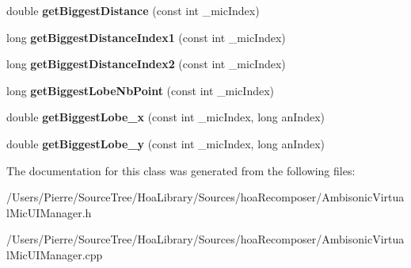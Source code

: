 \begin{DoxyCompactItemize}
\item 
\hypertarget{class_ambisonic_virtual_mic_u_i_manager_a7856cdd940fe530019a74c2dbda2b756}{double {\bfseries get\-Biggest\-Distance} (const int \-\_\-mic\-Index)}\label{class_ambisonic_virtual_mic_u_i_manager_a7856cdd940fe530019a74c2dbda2b756}

\item 
\hypertarget{class_ambisonic_virtual_mic_u_i_manager_a812fb44d360067072455ab8c98ac814c}{long {\bfseries get\-Biggest\-Distance\-Index1} (const int \-\_\-mic\-Index)}\label{class_ambisonic_virtual_mic_u_i_manager_a812fb44d360067072455ab8c98ac814c}

\item 
\hypertarget{class_ambisonic_virtual_mic_u_i_manager_aa462e67459e308e223477db5b6637da3}{long {\bfseries get\-Biggest\-Distance\-Index2} (const int \-\_\-mic\-Index)}\label{class_ambisonic_virtual_mic_u_i_manager_aa462e67459e308e223477db5b6637da3}

\item 
\hypertarget{class_ambisonic_virtual_mic_u_i_manager_a2e4fe83c9b8abd12d058e2b37efd814c}{long {\bfseries get\-Biggest\-Lobe\-Nb\-Point} (const int \-\_\-mic\-Index)}\label{class_ambisonic_virtual_mic_u_i_manager_a2e4fe83c9b8abd12d058e2b37efd814c}

\item 
\hypertarget{class_ambisonic_virtual_mic_u_i_manager_ade545b479351d887bee8570843b05947}{double {\bfseries get\-Biggest\-Lobe\-\_\-x} (const int \-\_\-mic\-Index, long an\-Index)}\label{class_ambisonic_virtual_mic_u_i_manager_ade545b479351d887bee8570843b05947}

\item 
\hypertarget{class_ambisonic_virtual_mic_u_i_manager_ae3e8b88c6d9d3c87f704c13a74e19a52}{double {\bfseries get\-Biggest\-Lobe\-\_\-y} (const int \-\_\-mic\-Index, long an\-Index)}\label{class_ambisonic_virtual_mic_u_i_manager_ae3e8b88c6d9d3c87f704c13a74e19a52}

\end{DoxyCompactItemize}


The documentation for this class was generated from the following files\-:\begin{DoxyCompactItemize}
\item 
/\-Users/\-Pierre/\-Source\-Tree/\-Hoa\-Library/\-Sources/hoa\-Recomposer/Ambisonic\-Virtual\-Mic\-U\-I\-Manager.\-h\item 
/\-Users/\-Pierre/\-Source\-Tree/\-Hoa\-Library/\-Sources/hoa\-Recomposer/Ambisonic\-Virtual\-Mic\-U\-I\-Manager.\-cpp\end{DoxyCompactItemize}
